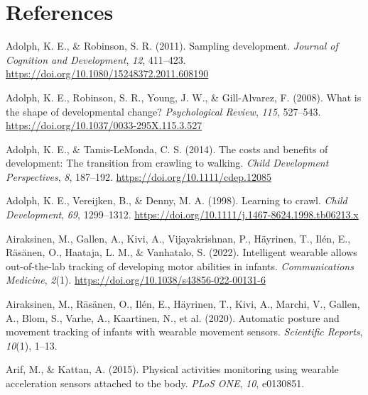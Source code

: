 \documentclass[
  man]{apa6}
\newlength{\cslhangindent}
\newlength{\cslentryspacingunit} %
\newenvironment{CSLReferences}[2] %
 {%
  \setlength{\parindent}{0pt}
  \ifodd #1
  \let\oldpar\par
  \def\par{\hangindent=\cslhangindent\oldpar}
  \fi
  \setlength{\parskip}{#2\cslentryspacingunit}
 }%
 {}
\begin{document}
\newpage

\hypertarget{references}{%
\section{References}\label{references}}

\hypertarget{refs}{}
\begin{CSLReferences}{1}{0}
\leavevmode{}%
Adolph, K. E., \& Robinson, S. R. (2011). Sampling development. \emph{Journal of Cognition and Development}, \emph{12}, 411--423. \url{https://doi.org/10.1080/15248372.2011.608190}

\leavevmode{}%
Adolph, K. E., Robinson, S. R., Young, J. W., \& Gill-Alvarez, F. (2008). What is the shape of developmental change? \emph{Psychological Review}, \emph{115}, 527--543. \url{https://doi.org/10.1037/0033-295X.115.3.527}

\leavevmode{}%
Adolph, K. E., \& Tamis-LeMonda, C. S. (2014). The costs and benefits of development: The transition from crawling to walking. \emph{Child Development Perspectives}, \emph{8}, 187--192. \url{https://doi.org/10.1111/cdep.12085}

\leavevmode{}%
Adolph, K. E., Vereijken, B., \& Denny, M. A. (1998). Learning to crawl. \emph{Child Development}, \emph{69}, 1299--1312. \url{https://doi.org/10.1111/j.1467-8624.1998.tb06213.x}

\leavevmode{}%
Airaksinen, M., Gallen, A., Kivi, A., Vijayakrishnan, P., Häyrinen, T., Ilén, E., Räsänen, O., Haataja, L. M., \& Vanhatalo, S. (2022). Intelligent wearable allows out-of-the-lab tracking of developing motor abilities in infants. \emph{Communications Medicine}, \emph{2}(1). \url{https://doi.org/10.1038/s43856-022-00131-6}

\leavevmode{}%
Airaksinen, M., Räsänen, O., Ilén, E., Häyrinen, T., Kivi, A., Marchi, V., Gallen, A., Blom, S., Varhe, A., Kaartinen, N., et al. (2020). Automatic posture and movement tracking of infants with wearable movement sensors. \emph{Scientific Reports}, \emph{10}(1), 1--13.

\leavevmode{}%
Arif, M., \& Kattan, A. (2015). Physical activities monitoring using wearable acceleration sensors attached to the body. \emph{{PLoS ONE}}, \emph{10}, e0130851.


\end{CSLReferences}
\end{document}
